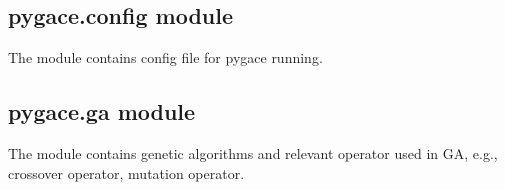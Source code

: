 \documentclass[letterpaper,10pt,english]{sphinxmanual}
\begin{document}
\subsection{pygace.config module}
\label{\detokenize{pygace:pygace-config-module}}\label{\detokenize{pygace:module-pygace.config}}
The module contains config file for pygace running.


\subsection{pygace.ga module}
\label{\detokenize{pygace:module-pygace.ga}}\label{\detokenize{pygace:pygace-ga-module}}
The module contains genetic algorithms and relevant operator used in GA, e.g.,
crossover operator, mutation operator.
\end{document}
